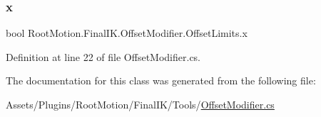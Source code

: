 \subsubsection{\texorpdfstring{x}{x}}
{\footnotesize\ttfamily bool Root\+Motion.\+Final\+I\+K.\+Offset\+Modifier.\+Offset\+Limits.\+x}



Definition at line 22 of file Offset\+Modifier.\+cs.



The documentation for this class was generated from the following file\+:\begin{DoxyCompactItemize}
\item 
Assets/\+Plugins/\+Root\+Motion/\+Final\+I\+K/\+Tools/\mbox{\hyperlink{_offset_modifier_8cs}{Offset\+Modifier.\+cs}}\end{DoxyCompactItemize}
